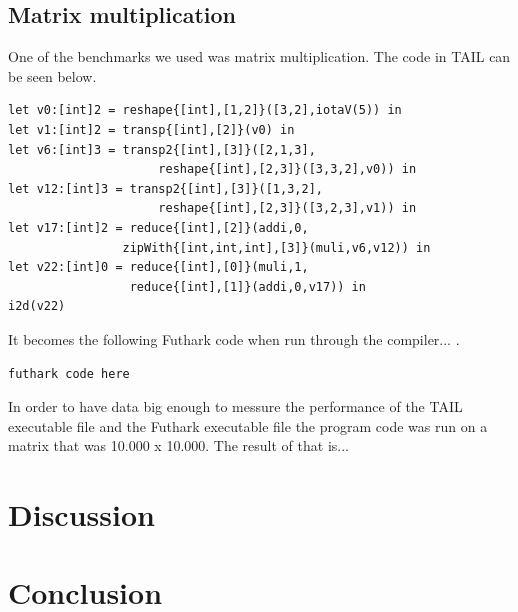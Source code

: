 \documentclass[11pt]{article}
\begin{document}
\subsection{Matrix multiplication}

One of the benchmarks we used was matrix multiplication. The code in TAIL can be seen below. 

\begin{lstlisting}
let v0:[int]2 = reshape{[int],[1,2]}([3,2],iotaV(5)) in
let v1:[int]2 = transp{[int],[2]}(v0) in
let v6:[int]3 = transp2{[int],[3]}([2,1,3],
                     reshape{[int],[2,3]}([3,3,2],v0)) in
let v12:[int]3 = transp2{[int],[3]}([1,3,2],
                     reshape{[int],[2,3]}([3,2,3],v1)) in
let v17:[int]2 = reduce{[int],[2]}(addi,0,
                zipWith{[int,int,int],[3]}(muli,v6,v12)) in
let v22:[int]0 = reduce{[int],[0]}(muli,1,
                 reduce{[int],[1]}(addi,0,v17)) in
i2d(v22)
\end{lstlisting}

It becomes the following Futhark code when run through the compiler...
.
\begin{lstlisting}
futhark code here
\end{lstlisting}

In order to have data big enough to messure the performance of the TAIL executable file and the Futhark executable file the program code was run on a matrix that was 10.000 x 10.000. 
The result of that is...

\section{Discussion}

\section{Conclusion}


{} 

\end{document}
